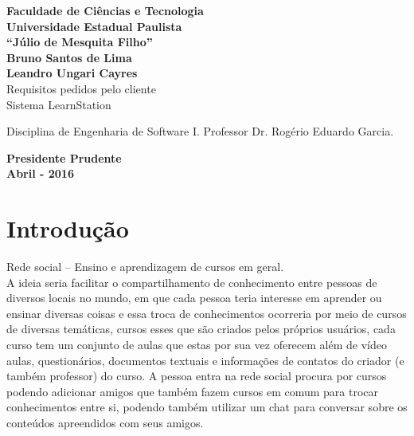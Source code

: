 \documentclass[12pt,a4paper,onecolumn,titlepage]{article}
\begin{document}

\begin{titlepage} %
	
	\vfill
	\begin{center}
	
		{\large \textbf{Faculdade de Ciências e Tecnologia\\Universidade Estadual Paulista\\``Júlio de Mesquita Filho''}} \\[3cm]
		{\large \textbf{Bruno Santos de Lima}}\\
		{\large \textbf{Leandro Ungari Cayres}}\\[4cm]
		{\Large Requisitos pedidos pelo cliente}\\
		{\Large Sistema LearnStation}\\[4cm]

	\hspace{.45\textwidth} %
	\begin{minipage}{.5\textwidth}
		\large Disciplina de Engenharia de Software I. Professor Dr. Rogério Eduardo Garcia.\\[0.5cm]
	\end{minipage}

	\vfill
	\vspace{1.5cm}
	
	\large \textbf{Presidente Prudente\\}
	\large \textbf{Abril - 2016}
	
	\end{center}
	
\end{titlepage}


\section{Introdução}
\label{sect:intro}

Rede social – Ensino e aprendizagem de cursos em geral.\\

A ideia seria facilitar o compartilhamento de conhecimento entre pessoas de diversos locais no mundo, em que cada pessoa teria interesse em aprender ou ensinar diversas coisas e essa troca de conhecimentos ocorreria por meio de cursos de diversas temáticas, cursos esses que são criados pelos próprios usuários, cada curso tem um conjunto de aulas que estas por sua vez oferecem além de vídeo aulas, questionários, documentos textuais e informações de contatos do criador (e também professor) do curso. A pessoa entra na rede social procura por cursos podendo adicionar amigos que também fazem cursos em comum para trocar conhecimentos entre si, podendo também utilizar um chat para conversar sobre os conteúdos apreendidos com seus amigos.
\end{document}
